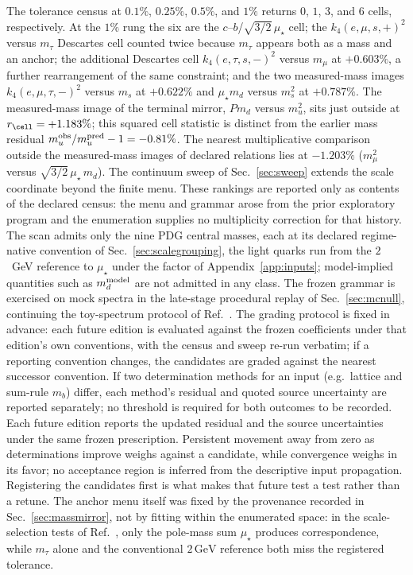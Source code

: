\documentclass[aps,twocolumn,superscriptaddress,nofootinbib,floatfix]{revtex4-2}
\newcommand{\mstar}{\mu_\star}
\begin{document}
The tolerance census at $0.1\%$, $0.25\%$, $0.5\%$, and $1\%$ returns $0$, $1$, $3$, and $6$ cells, respectively. At the $1\%$ rung the six are the $c$--$b$/$\sqrt{3/2}\,\mstar$ cell; the $k_4(e,\mu,s,+)^2$ versus $m_\tau$ Descartes cell counted twice because $m_\tau$ appears both as a mass and an anchor; the additional Descartes cell $k_4(e,\tau,s,-)^2$ versus $m_\mu$ at $+0.603\%$, a further rearrangement of the same constraint; and the two measured-mass images $k_4(e,\mu,\tau,-)^2$ versus $m_s$ at $+0.622\%$ and $\mstar m_d$ versus $m_s^2$ at $+0.787\%$. The measured-mass image of the terminal mirror, $P m_d$ versus $m_u^2$, sits just outside at $r_{\cell}=+1.183\%$; this squared cell statistic is distinct from the earlier mass residual $m_u^{\rm obs}/m_u^{\rm pred}-1=-0.81\%$. The nearest multiplicative comparison outside the measured-mass images of declared relations lies at $-1.203\%$ ($m_\mu^2$ versus $\sqrt{3/2}\,\mstar\,m_d$). The continuum sweep of Sec.~\ref{sec:sweep} extends the scale coordinate beyond the finite menu. These rankings are reported only as contents of the declared census: the menu and grammar arose from the prior exploratory program and the enumeration supplies no multiplicity correction for that history. The scan admits only the nine PDG central masses, each at its declared regime-native convention of Sec.~\ref{sec:scalegrouping}, the light quarks run from the $2$~GeV reference to $\mstar$ under the factor of Appendix~\ref{app:inputs}; model-implied quantities such as $m_d^{\rm model}$ are not admitted in any class. The frozen grammar is exercised on mock spectra in the late-stage procedural replay of Sec.~\ref{sec:mcnull}, continuing the toy-spectrum protocol of Ref.~\cite{BrilliantAPPB}. The grading protocol is fixed in advance: each future edition is evaluated against the frozen coefficients under that edition's own conventions, with the census and sweep re-run verbatim; if a reporting convention changes, the candidates are graded against the nearest successor convention. If two determination methods for an input (e.g.\ lattice and sum-rule $m_b$) differ, each method's residual and quoted source uncertainty are reported separately; no threshold is required for both outcomes to be recorded. Each future edition reports the updated residual and the source uncertainties under the same frozen prescription. Persistent movement away from zero as determinations improve weighs against a candidate, while convergence weighs in its favor; no acceptance region is inferred from the descriptive input propagation. Registering the candidates first is what makes that future test a test rather than a retune. The anchor menu itself was fixed by the provenance recorded in Sec.~\ref{sec:massmirror}, not by fitting within the enumerated space: in the scale-selection tests of Ref.~\cite{BrilliantAPPB}, only the pole-mass sum $\mstar$ produces correspondence, while $m_\tau$ alone and the conventional $2\,\mathrm{GeV}$ reference both miss the registered tolerance.
\end{document}
